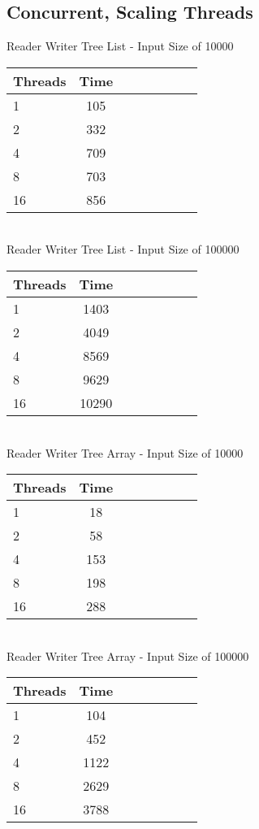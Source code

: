 \documentclass{sig-alternate}
\begin{document}
\subsection{Concurrent, Scaling Threads}

Reader Writer Tree List - Input Size of 10000 \\
\begin{tabular}{| l | c | c | c | c | c | c | r}
  \hline
  Threads & Time \\ \hline
  1 & 105 \\
  2 & 332 \\
  4 & 709 \\
  8 & 703 \\
  16 & 856 \\
  \hline
\end{tabular} \\

Reader Writer Tree List - Input Size of 100000 \\
\begin{tabular}{| l | c | c | c | c | c | c | r}
  \hline
  Threads & Time \\ \hline
  1 & 1403 \\
  2 & 4049 \\
  4 & 8569 \\
  8 & 9629 \\
  16 & 10290 \\
  \hline
\end{tabular} \\

Reader Writer Tree Array - Input Size of 10000 \\
\begin{tabular}{| l | c | c | c | c | c | c | r}
  \hline
  Threads & Time \\ \hline
  1 & 18 \\
  2 & 58 \\
  4 & 153 \\
  8 & 198 \\
  16 & 288 \\
  \hline
\end{tabular} \\

Reader Writer Tree Array - Input Size of 100000 \\
\begin{tabular}{| l | c | c | c | c | c | c | r}
  \hline
  Threads & Time \\ \hline
  1 & 104 \\
  2 & 452 \\
  4 & 1122 \\
  8 & 2629 \\
  16 & 3788 \\
  \hline
\end{tabular} \\
\end{document}
